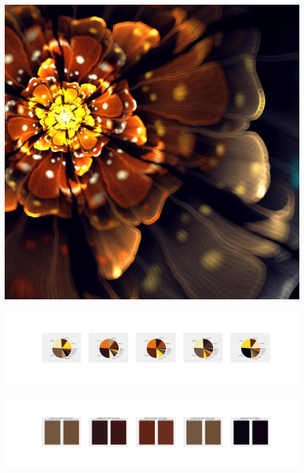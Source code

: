 \documentclass[11pt]{article}
\begin{document}
\begin{landscape}
    \begin{center}
    \includegraphics[width=\textwidth]{./nbimg/file (325).jpg}
    \end{center}

    \begin{center}
    \includegraphics[width=250mm]{./nbimg/pie-251.jpg}
    \end{center}

    \begin{center}
    \includegraphics[width=250mm]{./nbimg/peak-251.jpg}
    \end{center}
    


\end{landscape}
\end{document}
